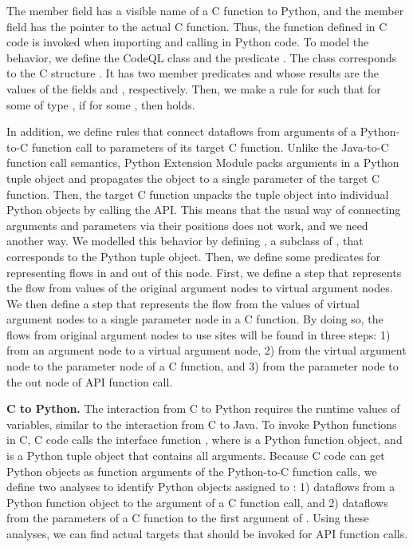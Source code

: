 \noindent
The member field  has a visible name of a C function to Python,
and the member field  has the pointer to the actual C function.
Thus, the function  defined in C code is invoked when
importing and calling  in Python code.
To model the behavior, we define the CodeQL class 
and the predicate . The class 
corresponds to the C structure . It has
two member predicates  and  whose results are
the values of the fields  and , respectively.
Then, we make a rule for  such that for some  of type ,
if  
for some , then   holds.


In addition, we define rules that connect dataflows from arguments of
a Python-to-C function call to parameters of its target C function.
Unlike the Java-to-C function call semantics, Python Extension Module
packs arguments in a Python tuple object and propagates the object to a single
parameter of the target C function. 
Then, the target C function unpacks the tuple object into individual Python
objects by calling the  API. 
This means that the usual way of connecting arguments and parameters via their
positions does not work, and we need another way.
We modelled this behavior by defining , a subclass of ,
that corresponds to the Python tuple object. Then, we define some predicates
for representing flows in and out of this node. First, we define a
step that represents the flow from values of the original argument nodes to virtual argument nodes. We then define
a step that represents the flow from the values of virtual argument nodes to a single parameter node in a C function.
By doing so, the flows from original argument nodes to use sites will be
found in three steps: 1) from an argument node to a virtual argument node,
2) from the virtual argument node to the parameter node of a C function,
and 3) from the parameter node to the out node of  API function call.


\medskip

\textbf{C to Python.} The interaction from C to Python requires the runtime
values of variables, similar to the interaction from C to Java. 
To invoke Python functions in C, C code calls the interface function
, where  is a Python
function object, and  is a Python tuple object that contains
all arguments. 
Because C code can get Python objects as
function arguments of the Python-to-C function calls,
we define two
 analyses to identify Python objects assigned to :
1) dataflows from a Python function object to the argument of a C function call,
and 2) dataflows from the parameters of a C function to the first argument of .
Using these  analyses, we can find actual targets that should be invoked
for  API function calls.


